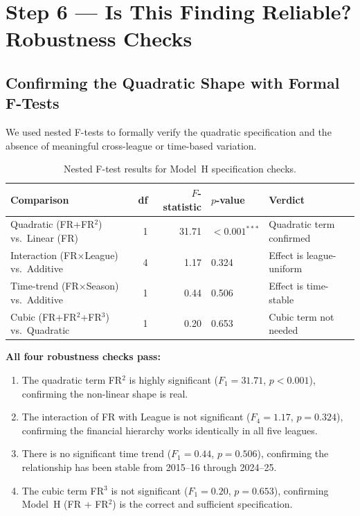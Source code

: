 \documentclass[11pt, a4paper]{article}
\begin{document}
\section{Step 6 --- Is This Finding Reliable? Robustness Checks}
\label{sec:robustness}

\subsection{Confirming the Quadratic Shape with Formal F-Tests}

We used nested F-tests to formally verify the quadratic specification and the
absence of meaningful cross-league or time-based variation.

\begin{table}[H]
  \centering
  \small
  \caption{Nested F-test results for Model~H specification checks.}
  \label{tab:ftests}
  \begin{tabular}{p{5.5cm} r r l p{4.0cm}}
    \toprule
    \rowcolor{NavyBlue}
    \color{white}\textbf{Comparison} &
    \color{white}\textbf{df} &
    \color{white}\textbf{$F$-statistic} &
    \color{white}\textbf{$p$-value} &
    \color{white}\textbf{Verdict} \\
    \midrule
    \rowcolor{RowB}
    Quadratic (FR+FR$^2$) vs.\ Linear (FR)
      & 1 & 31.71 & $< 0.001^{***}$
      & Quadratic term confirmed \\
    Interaction (FR$\times$League) vs.\ Additive
      & 4 & 1.17  & 0.324
      & Effect is league-uniform \\
    \rowcolor{RowA}
    Time-trend (FR$\times$Season) vs.\ Additive
      & 1 & 0.44  & 0.506
      & Effect is time-stable \\
    Cubic (FR+FR$^2$+FR$^3$) vs.\ Quadratic
      & 1 & 0.20  & 0.653
      & Cubic term not needed \\
    \bottomrule
  \end{tabular}
\end{table}

\begin{successbox}
  \textbf{All four robustness checks pass:}
  \begin{enumerate}[noitemsep]
    \item The quadratic term FR$^2$ is highly significant
          ($F_{1} = 31.71$, $p < 0.001$), confirming the non-linear shape is real.
    \item The interaction of FR with League is not significant ($F_{4} = 1.17$,
          $p = 0.324$), confirming the financial hierarchy works identically in
          all five leagues.
    \item There is no significant time trend ($F_{1} = 0.44$, $p = 0.506$),
          confirming the relationship has been stable from 2015--16 through 2024--25.
    \item The cubic term FR$^3$ is not significant ($F_{1} = 0.20$, $p = 0.653$),
          confirming Model~H (FR + FR$^2$) is the correct and sufficient specification.
  \end{enumerate}
\end{successbox}
\end{document}
